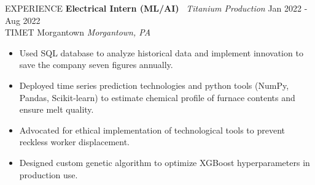 \documentclass{resume} %
\begin{document}
\begin{rSection}{EXPERIENCE}
\textbf{Electrical Intern (ML/AI)} \textbar\ \textit{Titanium Production} \hfill Jan 2022 - Aug 2022\\
TIMET Morgantown \hfill \textit{Morgantown, PA}
\begin{itemize}
    \itemsep-3pt {}
    \item Used SQL database to analyze historical data and implement innovation to save the company seven figures annually.
    \item Deployed time series prediction technologies and python tools (NumPy, Pandas, Scikit-learn) to estimate chemical profile of furnace contents and ensure melt quality.
    \item Advocated for ethical implementation of technological tools to prevent reckless worker displacement.
    \item Designed custom genetic algorithm to optimize XGBoost hyperparameters in production use.
\end{itemize}

\end{rSection} 
\end{document}
